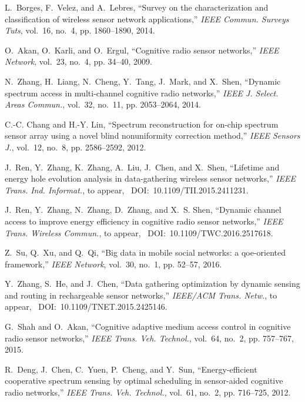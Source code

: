 \documentclass[journal]{IEEEtran} \ifCLASSINFOpdf
\begin{document}
\begin{thebibliography}{99}

L.~Borges, F.~Velez, and A.~Lebres, ``Survey on the characterization and classification of wireless sensor network applications,'' \emph{IEEE Commun. Surveys Tuts}, vol.~16, no.~4, pp. 1860--1890, 2014.

O.~Akan, O.~Karli, and O.~Ergul, ``Cognitive radio sensor networks,'' \emph{IEEE Network}, vol.~23, no.~4, pp. 34--40, 2009.

N.~Zhang, H.~Liang, N.~Cheng, Y.~Tang, J.~Mark, and X.~Shen, ``Dynamic spectrum access in multi-channel cognitive radio networks,'' \emph{IEEE J. Select. Areas Commun.}, vol.~32, no.~11, pp. 2053--2064, 2014.

C.-C. Chang and H.-Y. Lin, ``Spectrum reconstruction for on-chip spectrum
  sensor array using a novel blind nonuniformity correction method,''
  \emph{IEEE Sensors J.}, vol.~12, no.~8, pp. 2586--2592, 2012.

J.~Ren, Y.~Zhang, K.~Zhang, A.~Liu, J.~Chen, and X.~Shen, ``Lifetime and energy
  hole evolution analysis in data-gathering wireless sensor networks,''
  \emph{IEEE Trans. Ind. Informat.}, to appear,
  ~{DOI}:~10.1109/TII.2015.2411231.

J.~Ren, Y.~Zhang, N.~Zhang, D.~Zhang, and X.~S. Shen, ``Dynamic channel access
  to improve energy efficiency in cognitive radio sensor networks,'' \emph{IEEE
  Trans. Wireless Commun.}, to appear, ~{DOI}:~10.1109/TWC.2016.2517618.

Z.~Su, Q.~Xu, and Q.~Qi, ``Big data in mobile social networks: a qoe-oriented
  framework,'' \emph{IEEE Network}, vol.~30, no.~1, pp. 52--57, 2016.

Y.~Zhang, S.~He, and J.~Chen, ``Data gathering optimization by dynamic sensing
  and routing in rechargeable sensor networks,'' \emph{IEEE/ACM Trans. Netw.},
  to appear, ~{DOI}:~10.1109/TNET.2015.2425146.

G.~Shah and O.~Akan, ``Cognitive adaptive medium access control in cognitive
  radio sensor networks,'' \emph{IEEE Trans. Veh. Technol.}, vol.~64, no.~2,
  pp. 757--767, 2015.

R.~Deng, J.~Chen, C.~Yuen, P.~Cheng, and Y.~Sun, ``Energy-efficient cooperative
  spectrum sensing by optimal scheduling in sensor-aided cognitive radio
  networks,'' \emph{IEEE Trans. Veh. Technol.}, vol.~61, no.~2, pp. 716--725,
  2012.


\end{thebibliography}
\end{document}
